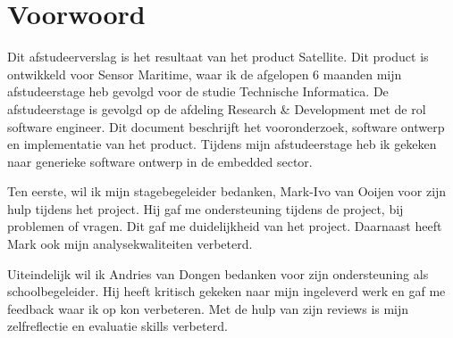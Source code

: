 \chapter*{Voorwoord}
Dit afstudeerverslag is het resultaat van het product Satellite. Dit product is ontwikkeld voor Sensor Maritime, waar ik de afgelopen 6 maanden mijn afstudeerstage heb gevolgd voor de studie Technische Informatica. De afstudeerstage is gevolgd op de afdeling Research \& Development met de rol software engineer. Dit document beschrijft het vooronderzoek, software ontwerp en implementatie van het product. Tijdens mijn afstudeerstage heb ik gekeken naar generieke software ontwerp in de embedded sector. \newline

\noindent Ten eerste, wil ik mijn stagebegeleider bedanken, Mark-Ivo van Ooijen voor zijn hulp tijdens het project. Hij gaf me ondersteuning tijdens de project, bij problemen of vragen. Dit gaf me duidelijkheid van het project. Daarnaast heeft Mark ook mijn analysekwaliteiten verbeterd. \newline

\noindent Uiteindelijk wil ik Andries van Dongen bedanken voor zijn ondersteuning als schoolbegeleider. Hij heeft kritisch gekeken naar mijn ingeleverd werk en gaf me feedback waar ik op kon verbeteren. Met de hulp van zijn reviews is mijn zelfreflectie en evaluatie skills verbeterd.
